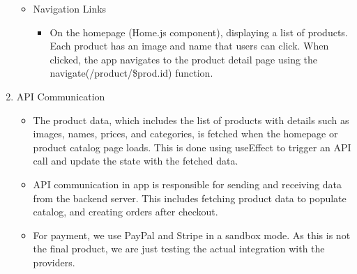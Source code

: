 \documentclass{llncs}
\begin{document}
\begin{enumerate}
\begin{itemize}
              \item Navigation Links
                    \begin{itemize}
                        \item On the homepage (Home.js component), displaying a list of products. Each product has an image and name that users can click. When clicked, the app navigates to the product detail page using the navigate(/product/\${prod.id}) function.\\
                    \end{itemize}
          \end{itemize}
    \item API Communication
          \begin{itemize}
              \item The product data, which includes the list of products with details such as images, names, prices, and categories, is fetched when the homepage or product catalog page loads.
                    This is done using useEffect to trigger an API call and update the state with the fetched data.
              \item API communication in app is responsible for sending and receiving data from the backend server. This includes fetching product data to populate catalog, and creating orders after checkout.
              \item For payment, we use PayPal and Stripe in a sandbox mode. As this is not the final product, we are just testing the actual integration with the providers.
          \end{itemize}

\end{enumerate}
\end{document}

